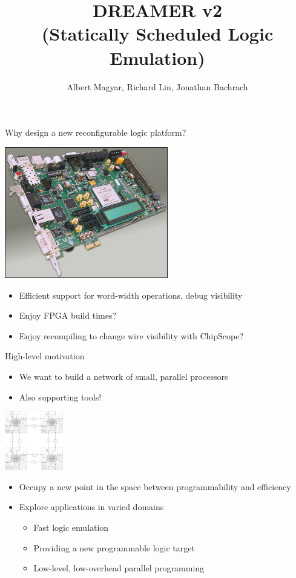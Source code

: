 \documentclass{beamer}
\title{DREAMER v2\\(Statically Scheduled Logic Emulation)}
\author{Albert Magyar, Richard Lin, Jonathan Bachrach}
\begin{document}
\begin{frame}
\maketitle
\end{frame}

\begin{frame}{Why design a new reconfigurable logic platform?}
\begin{center}
\includegraphics[width=2.8in]{virtex.jpg}
\end{center}
\begin{itemize}
\item Efficient support for word-width operations, debug visibility
\item Enjoy FPGA build times?
\item Enjoy recompiling to change wire visibility with ChipScope?
\end{itemize}
\end{frame}

\begin{frame}{High-level motivation}
\begin{itemize}
\item We want to build a network of small, parallel processors
\item Also supporting tools!
\end{itemize}
\begin{center}
\includegraphics[width=1in]{array_4x4.png}
\end{center}
\begin{itemize}
\item Occupy a new point in the space between programmability and efficiency
\item Explore applications in varied domains
\begin{itemize}
\item Fast logic emulation
\item Providing a new programmable logic target
\item Low-level, low-overhead parallel programming
\end{itemize}
\end{itemize}
\end{frame}
\end{document}
